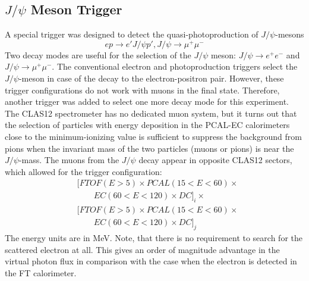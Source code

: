 \subsection{$J/\psi$ Meson Trigger}
\label{sec:meson_trigger}
A special trigger was designed to detect the quasi-photoproduction of $J/\psi$-mesons
$$
ep \to e' J/\psi p', J/\psi \to \mu^+\mu^-
$$
Two decay modes are useful for the selection of the $J/\psi$ meson: $J/\psi \to e^+e^-$ and $J/\psi \to \mu^+\mu^-$.
The conventional electron and photoproduction triggers  select the $J/\psi$-meson  in case of the decay to the electron-positron pair. However, these trigger configurations do not  work  with muons in the final state. Therefore, another trigger was added to select one more decay mode for this experiment. The CLAS12 spectrometer has no dedicated muon system, but it turns out that the selection of particles with energy deposition in the PCAL-EC calorimeters close to the minimum-ionizing  value is sufficient to suppress the background from pions when the invariant mass of the two particles (muons or pions) is near the $J/\psi$-mass. The muons from the $J/\psi$ decay appear in opposite CLAS12 sectors, which allowed for the trigger configuration:  
\begin{align*} 
 & [FTOF(E{{>}}5){\times}  PCAL(15{<}E{<}60){\times} \\
 & {\qquad} EC(60{<}E{<}120){\times}   DC]_i {\times} \\
 & [FTOF(E{{>}}5){\times}  PCAL(15{<}E{<}60){\times} \\
 & {\qquad} EC(60{<}E{<}120){\times}   DC]_j  
\end{align*}
\noindent
The energy units are in MeV. Note, that there is no requirement to search for the scattered electron at all. This gives an order of magnitude advantage in the  virtual photon flux in comparison with the case when the electron is detected in the FT calorimeter.
